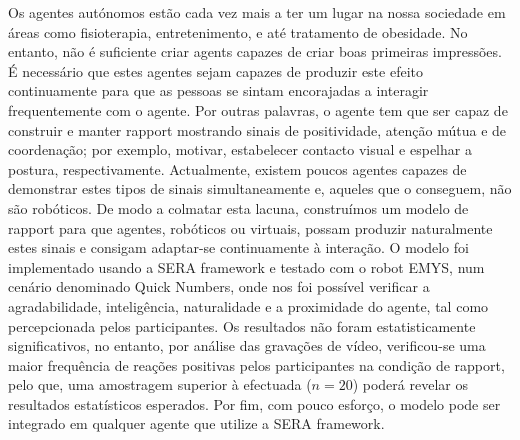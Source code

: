 \noindent Os agentes autónomos estão cada vez mais a ter um lugar na nossa sociedade em áreas como fisioterapia, entretenimento, e até tratamento de obesidade. No entanto, não é suficiente criar agents capazes de criar boas primeiras impressões. É necessário que estes agentes sejam capazes de produzir este efeito continuamente para que as pessoas se sintam encorajadas a interagir frequentemente com o agente. Por outras palavras, o agente tem que ser capaz de construir e manter rapport mostrando sinais de positividade, atenção mútua e de coordenação; por exemplo, motivar, estabelecer contacto visual e espelhar a postura, respectivamente. Actualmente, existem poucos agentes capazes de demonstrar estes tipos de sinais simultaneamente e, aqueles que o conseguem, não são robóticos. De modo a colmatar esta lacuna, construímos um modelo de rapport para que agentes, robóticos ou virtuais, possam produzir naturalmente estes sinais e consigam adaptar-se continuamente à interação. O modelo foi implementado usando a \acf{SERA} framework e testado com o robot \acf{EMYS}, num cenário denominado Quick Numbers, onde nos foi possível verificar a agradabilidade, inteligência, naturalidade e a proximidade do agente, tal como percepcionada pelos participantes. Os resultados não foram estatisticamente significativos, no entanto, por análise das gravações de vídeo, verificou-se uma maior frequência de reações positivas pelos participantes na condição de rapport, pelo que, uma amostragem superior à efectuada ($n=20$) poderá revelar os resultados estatísticos esperados. Por fim, com pouco esforço, o modelo pode ser integrado em qualquer agente que utilize a \ac{SERA} framework.